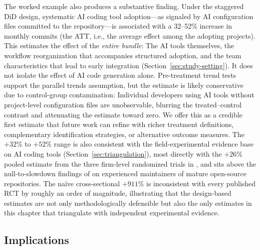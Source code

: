 The worked example also produces a substantive finding.
Under the staggered DiD design, systematic AI coding tool adoption---as signaled by AI configuration files committed to the repository---is associated with a 32--52\% increase in monthly commits (the ATT, i.e., the average effect among the adopting projects).
This estimates the effect of the \emph{entire bundle}: The AI tools themselves, the workflow reorganization that accompanies structured adoption, and the team characteristics that lead to early integration (Section~\ref{sec:study-setting}).
It does not isolate the effect of AI code generation alone.
Pre-treatment trend tests support the parallel trends assumption, but the estimate is likely conservative due to control-group contamination: Individual developers using AI tools without project-level configuration files are unobservable, blurring the treated--control contrast and attenuating the estimate toward zero.
We offer this as a credible first estimate that future work can refine with richer treatment definitions, complementary identification strategies, or alternative outcome measures.
The $+32\%$ to $+52\%$ range is also consistent with the field-experimental evidence base on AI coding tools (Section~\ref{sec:triangulation}), most directly with the $+26\%$ pooled estimate from the three firm-level randomized trials in \citet{cui2025effects}, and sits above the null-to-slowdown findings of \citet{DBLP:journals/corr/abs-2507-09089} on experienced maintainers of mature open-source repositories.
The na\"ive cross-sectional $+911\%$ is inconsistent with every published RCT by roughly an order of magnitude, illustrating that the design-based estimates are not only methodologically defensible but also the only estimates in this chapter that triangulate with independent experimental evidence.

\subsection{Implications}


